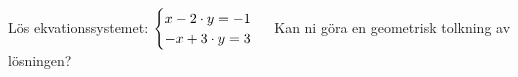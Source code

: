 Lös ekvationssystemet: 
\begin{math}
	\begin{cases}
	x - 2 \cdot y = -1 \\
	-x + 3 \cdot y = 3 \\
	\end{cases}
	\\
	\\
\end{math}
Kan ni göra en geometrisk tolkning av lösningen?